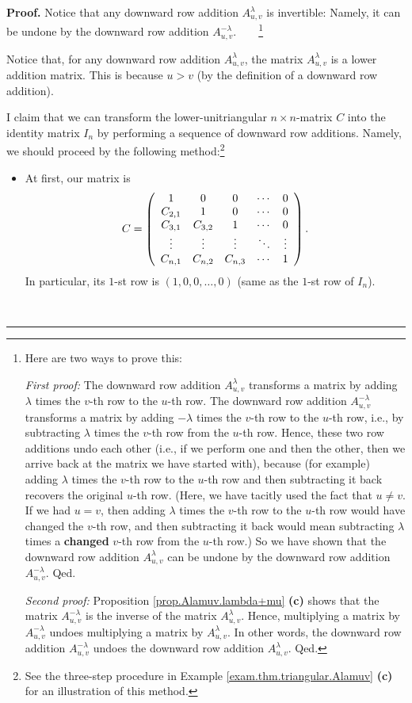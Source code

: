 \documentclass[numbers=enddot,12pt,final,onecolumn,notitlepage]{scrartcl}%
\theoremstyle{definition}
\newenvironment{proof}[1][Proof]{\noindent\textbf{#1.} }{\ \rule{0.5em}{0.5em}}
\begin{document}
\begin{proof}
Notice that any downward row addition $A_{u,v}^{\lambda}$ is invertible:
Namely, it can be undone by the downward row addition $A_{u,v}^{-\lambda}%
$.\ \ \ \ \footnote{Here are two ways to prove this:
\par
\textit{First proof:} The downward row addition $A_{u,v}^{\lambda}$ transforms
a matrix by adding $\lambda$ times the $v$-th row to the $u$-th row. The
downward row addition $A_{u,v}^{-\lambda}$ transforms a matrix by adding
$-\lambda$ times the $v$-th row to the $u$-th row, i.e., by subtracting
$\lambda$ times the $v$-th row from the $u$-th row. Hence, these two row
additions undo each other (i.e., if we perform one and then the other, then we
arrive back at the matrix we have started with), because (for example) adding
$\lambda$ times the $v$-th row to the $u$-th row and then subtracting it back
recovers the original $u$-th row. (Here, we have tacitly used the fact that
$u\neq v$. If we had $u=v$, then adding $\lambda$ times the $v$-th row to the
$u$-th row would have changed the $v$-th row, and then subtracting it back
would mean subtracting $\lambda$ times a \textbf{changed} $v$-th row from the
$u$-th row.) So we have shown that the downward row addition $A_{u,v}%
^{\lambda}$ can be undone by the downward row addition $A_{u,v}^{-\lambda}$.
Qed.
\par
\textit{Second proof:} Proposition \ref{prop.Alamuv.lambda+mu} \textbf{(c)}
shows that the matrix $A_{u,v}^{-\lambda}$ is the inverse of the matrix
$A_{u,v}^{\lambda}$. Hence, multiplying a matrix by $A_{u,v}^{-\lambda}$
undoes multiplying a matrix by $A_{u,v}^{\lambda}$. In other words, the
downward row addition $A_{u,v}^{-\lambda}$ undoes the downward row addition
$A_{u,v}^{\lambda}$. Qed.}

Notice that, for any downward row addition $A^{\lambda}_{u,v}$, the matrix
$A^{\lambda}_{u,v}$ is a lower addition matrix. This is because $u > v$ (by
the definition of a downward row addition).

I claim that we can transform the lower-unitriangular $n\times n$-matrix $C$
into the identity matrix $I_{n}$ by performing a sequence of downward row
additions. Namely, we should proceed by the following method:\footnote{See the
three-step procedure in Example \ref{exam.thm.triangular.Alamuv} \textbf{(c)}
for an illustration of this method.}

\begin{itemize}
\item At first, our matrix is
\[
C = \left(
\begin{array}
[c]{ccccc}%
1 & 0 & 0 & \cdots & 0\\
C_{2,1} & 1 & 0 & \cdots & 0\\
C_{3,1} & C_{3,2} & 1 & \cdots & 0\\
\vdots & \vdots & \vdots & \ddots & \vdots\\
C_{n,1} & C_{n,2} & C_{n,3} & \cdots & 1
\end{array}
\right)  .
\]
In particular, its $1$-st row is $\left(  1,0,0,\ldots,0\right)  $ (same as
the $1$-st row of $I_{n}$).


\end{itemize}
\end{proof}
\end{document}
